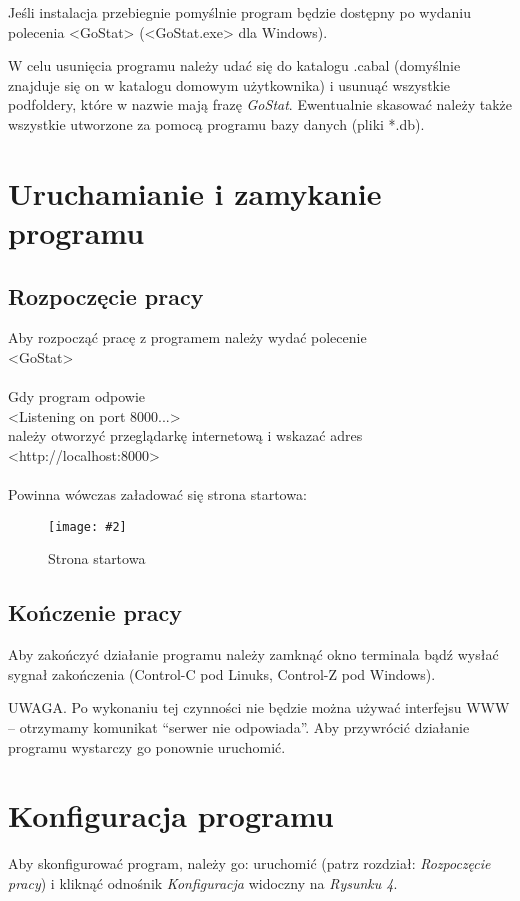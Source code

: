 \documentclass[10pt,leqno]{article}
\newcommand{\myimage}[3]{
  \begin{figure}[h!]
    \centering
      \texttt{[image: \#2]}
  \caption{#3}
  \end{figure}
}
\begin{document}
Jeśli instalacja przebiegnie pomyślnie program będzie dostępny po wydaniu polecenia <GoStat> (<GoStat.exe> dla Windows).

W celu usunięcia programu należy udać się do katalogu .cabal (domyślnie znajduje się on w katalogu domowym użytkownika) i usunuąć wszystkie
podfoldery, które w nazwie mają frazę \emph{GoStat}. Ewentualnie skasować należy także wszystkie utworzone za pomocą programu bazy danych (pliki *.db).

\newpage

\section{Uruchamianie i zamykanie programu}

\subsection{Rozpoczęcie pracy}
Aby rozpocząć pracę z programem należy wydać polecenie \\
<GoStat> \\ 
\\
Gdy program odpowie \\
<Listening on port 8000...> \\
należy otworzyć przeglądarkę internetową i wskazać adres \\
<http://localhost:8000> \\
\\
Powinna wówczas załadować się strona startowa:

\myimage{0.4}{start.png}{Strona startowa}

\subsection{Kończenie pracy}
Aby zakończyć działanie programu należy zamknąć okno terminala bądź wysłać sygnał zakończenia (Control-C pod Linuks, Control-Z pod Windows).

UWAGA. Po wykonaniu tej czynności nie będzie można używać interfejsu WWW -- otrzymamy komunikat ``serwer nie odpowiada''. Aby przywrócić działanie programu
wystarczy go ponownie uruchomić.


\newpage

\section{Konfiguracja programu}
Aby skonfigurować program, należy go: uruchomić (patrz rozdział: \emph{Rozpoczęcie pracy}) i kliknąć odnośnik \emph{Konfiguracja} 
widoczny na \emph{Rysunku 4}.
\end{document}
